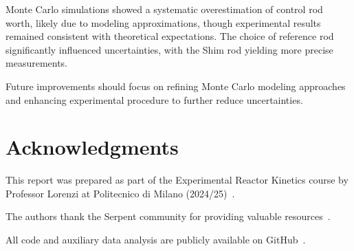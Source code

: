 Monte Carlo simulations showed a systematic overestimation of control rod worth, likely due to modeling approximations, 
though experimental results remained consistent with theoretical expectations. 
The choice of reference rod significantly influenced uncertainties, with the Shim rod yielding more precise measurements. 

Future improvements should focus on refining Monte Carlo modeling approaches and enhancing experimental procedure to further reduce uncertainties.

\section*{Acknowledgments}
This report was prepared as part of the Experimental Reactor Kinetics course by Professor Lorenzi at Politecnico di Milano (2024/25)~\parencite{Lorenzi2024}.

The authors thank the Serpent community for providing valuable resources~\parencite{SerpentWiki, SerpentForum}. 

All code and auxiliary data analysis are publicly available on GitHub~\parencite{PagliucaGithub}.
